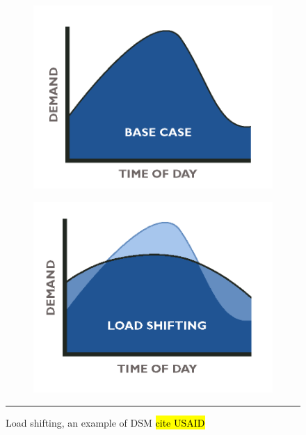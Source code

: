 \begin{figure}
	\centering
	\begin{subfigure}{.2\textwidth}
		\centering
		\includegraphics[width=\textwidth]{figures/DSM-base.png}
	\end{subfigure}
	\begin{subfigure}{.2\textwidth}
		\centering
		\includegraphics[width=\textwidth]{figures/DSM-load-shift.png}
	\end{subfigure}
	\rule{0.2\textwidth}{0.5pt} %
	\caption[Load shifting, an example of DSM.]{Load shifting, an example of DSM \hl{cite USAID}
	}
	\label{fig:DSM}
\end{figure}

